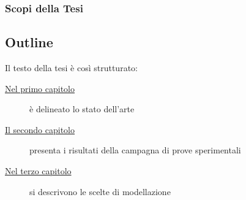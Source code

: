 \subsubsection{Scopi della Tesi}
%
\lipsum[1-3]
%
%
\clearpage
%
\subsection*{Outline}
%
\par Il testo della tesi è così strutturato:
%
%
\begin{description}
%
\item[{\hyperref[cap:statoarte]{Nel primo capitolo}}] è delineato lo stato dell'arte \lipsum[1]
%
\item[{\hyperref[cap:provesperimentali]{Il secondo capitolo}}] presenta i risultati della campagna di prove sperimentali \lipsum[2]
%
\item[{\hyperref[cap:analisinumeriche]{Nel terzo capitolo}}] si descrivono le scelte di modellazione \lipsum[3]
%
\end{description}
%
